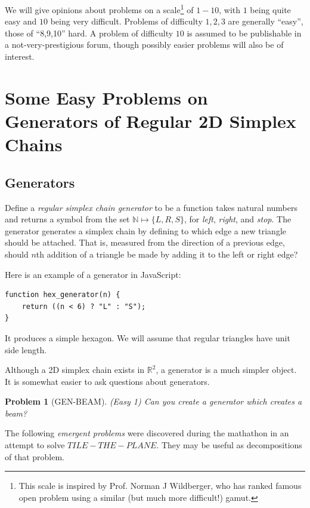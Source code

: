 \documentclass[11pt]{article}
\newtheorem{problem}{Problem}
\begin{document}
We will give opinions about problems on a scale\footnote{This scale is inspired by Prof. Norman J Wildberger, who has ranked famous open problem using a similar
  (but much more difficult!) gamut.} of $1-10$, with $1$ being quite easy and $10$ being very difficult. Problems of difficulty $1,2,3$
are generally ``easy'', those of ``8,9,10'' hard.  A problem of difficulty $10$ is assumed to be publishable in a not-very-prestigious forum, though
possibly easier problems will also be of interest. 

\section{Some Easy Problems on Generators of Regular 2D Simplex Chains}

\subsection{Generators}

Define a {\em regular simplex chain generator} to be a function takes natural numbers and returns a symbol from the set $\mathbb{N} \mapsto \{L,R,S\}$,
  for {\em left}, {\em right}, and {\em stop}. The generator generates a simplex chain by defining to which edge a new triangle should
  be attached. That is, measured from the direction of a previous edge, should $n$th addition of a triangle be made by adding it
  to the left or right edge?

  Here is an example of a generator in JavaScript:
\begin{verbatim}
function hex_generator(n) {
    return ((n < 6) ? "L" : "S");
}
\end{verbatim}
It produces a simple hexagon. We will assume that regular triangles have unit side length.

Although a 2D simplex chain exists in $\mathbb{R}^2$, a generator is a much simpler object.  It is somewhat easier to ask questions about
generators.

\begin{problem}[GEN-BEAM]
  (Easy 1) Can you create a generator which creates a beam?
\end{problem}

The following {\em emergent problems} were discovered during the mathathon in an attempt to solve $TILE-THE-PLANE$. They may be useful as decompositions of that problem.
\end{document}
